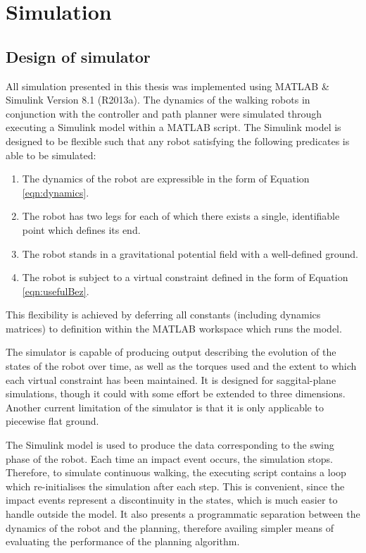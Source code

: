 \chapter{Simulation} \label{chap:sim}
\section{Design of simulator}
All simulation presented in this thesis was implemented using MATLAB \& Simulink Version 8.1 (R2013a). The dynamics of the walking robots in conjunction with the controller and path planner were simulated through executing a Simulink model within a MATLAB script. The Simulink model is designed to be flexible such that any robot satisfying the following predicates is able to be simulated:
\begin{enumerate}
	\item The dynamics of the robot are expressible in the form of Equation \ref{eqn:dynamics}.
	\item The robot has two legs for each of which there exists a single, identifiable point which defines its end.
	\item The robot stands in a gravitational potential field with a well-defined ground.
	\item The robot is subject to a virtual constraint defined in the form of Equation \ref{eqn:usefulBez}.
\end{enumerate}

This flexibility is achieved by deferring all constants (including dynamics matrices) to definition within the MATLAB workspace which runs the model.

The simulator is capable of producing output describing the evolution of the states of the robot over time, as well as the torques used and the extent to which each virtual constraint has been maintained. It is designed for saggital-plane simulations, though it could with some effort be extended to three dimensions. Another current limitation of the simulator is that it is only applicable to piecewise flat ground.

The Simulink model is used to produce the data corresponding to the swing phase of the robot. Each time an impact event occurs, the simulation stops. Therefore, to simulate continuous walking, the executing script contains a loop which re-initialises the simulation after each step. This is convenient, since the impact events represent a discontinuity in the states, which is much easier to handle outside the model. It also presents a programmatic separation between the dynamics of the robot and the planning, therefore availing simpler means of evaluating the performance of the planning algorithm.

